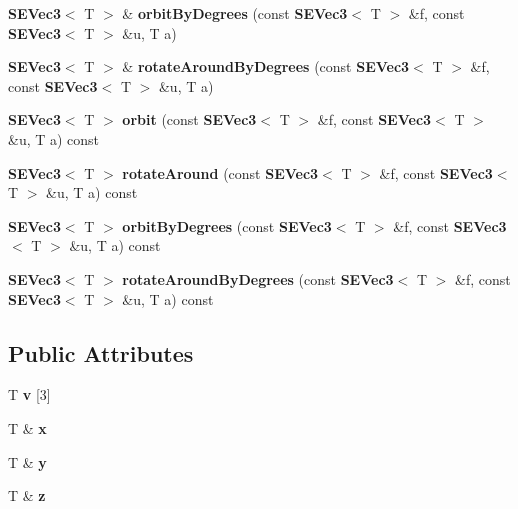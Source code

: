 \begin{DoxyCompactItemize}
\item 
{\bf S\+E\+Vec3}$<$ T $>$ \& {\bf orbit\+By\+Degrees} (const {\bf S\+E\+Vec3}$<$ T $>$ \&f, const {\bf S\+E\+Vec3}$<$ T $>$ \&u, T a)
\item 
{\bf S\+E\+Vec3}$<$ T $>$ \& {\bf rotate\+Around\+By\+Degrees} (const {\bf S\+E\+Vec3}$<$ T $>$ \&f, const {\bf S\+E\+Vec3}$<$ T $>$ \&u, T a)
\item 
{\bf S\+E\+Vec3}$<$ T $>$ {\bf orbit} (const {\bf S\+E\+Vec3}$<$ T $>$ \&f, const {\bf S\+E\+Vec3}$<$ T $>$ \&u, T a) const 
\item 
{\bf S\+E\+Vec3}$<$ T $>$ {\bf rotate\+Around} (const {\bf S\+E\+Vec3}$<$ T $>$ \&f, const {\bf S\+E\+Vec3}$<$ T $>$ \&u, T a) const 
\item 
{\bf S\+E\+Vec3}$<$ T $>$ {\bf orbit\+By\+Degrees} (const {\bf S\+E\+Vec3}$<$ T $>$ \&f, const {\bf S\+E\+Vec3}$<$ T $>$ \&u, T a) const 
\item 
{\bf S\+E\+Vec3}$<$ T $>$ {\bf rotate\+Around\+By\+Degrees} (const {\bf S\+E\+Vec3}$<$ T $>$ \&f, const {\bf S\+E\+Vec3}$<$ T $>$ \&u, T a) const 
\end{DoxyCompactItemize}
\subsection*{Public Attributes}
\begin{DoxyCompactItemize}
\item 
T {\bf v} [3]
\item 
T \& {\bf x}
\item 
T \& {\bf y}
\item 
T \& {\bf z}
\end{DoxyCompactItemize}
